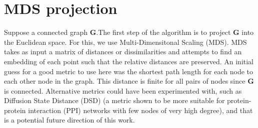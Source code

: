 \documentclass{report}
\begin{document}
%

\section{MDS projection}
Suppose a connected graph $\textbf{G}$.The first step of the algorithm is to project $\textbf{G}$ into the Euclidean space. For this, we use Multi-Dimensitonal Scaling (MDS). MDS takes as input a matrix of distances or dissimilarities and attempts to find an embedding of each point such that the relative distances are preserved. An initial guess for a good metric to use here was the shortest path length for each node to each other node in the graph. This distance is finite for all pairs of nodes since $\textbf{G}$ is connected. Alternative metrics could have been experimented with, such as Diffusion State Distance (DSD) \cite{cao2013going} (a metric shown to be more suitable for protein-protein interaction (PPI) networks with few nodes of very high degree), and that is a potential future direction of this work.
\end{document}
